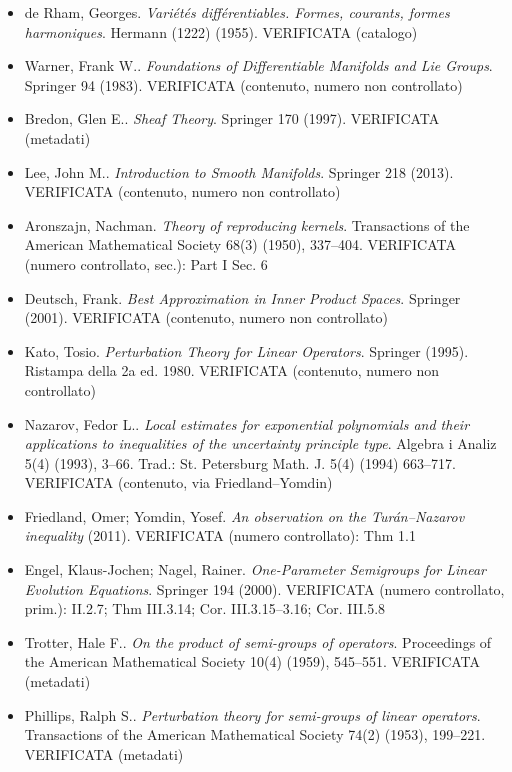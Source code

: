 \begin{itemize}[itemsep=2pt,leftmargin=1.2em,font=\small]
\item de Rham, Georges. \emph{Vari{\'e}t{\'e}s diff{\'e}rentiables. Formes, courants, formes harmoniques}. Hermann (1222) (1955). \textsf{\footnotesize VERIFICATA (catalogo)}
\item Warner, Frank W.. \emph{Foundations of Differentiable Manifolds and Lie Groups}. Springer 94 (1983). \textsf{\footnotesize VERIFICATA (contenuto, numero non controllato)}
\item Bredon, Glen E.. \emph{Sheaf Theory}. Springer 170 (1997). \textsf{\footnotesize VERIFICATA (metadati)}
\item Lee, John M.. \emph{Introduction to Smooth Manifolds}. Springer 218 (2013). \textsf{\footnotesize VERIFICATA (contenuto, numero non controllato)}
\item Aronszajn, Nachman. \emph{Theory of reproducing kernels}. Transactions of the American Mathematical Society 68(3) (1950), 337--404. \textsf{\footnotesize VERIFICATA (numero controllato, sec.): Part I Sec. 6}
\item Deutsch, Frank. \emph{Best Approximation in Inner Product Spaces}. Springer (2001). \textsf{\footnotesize VERIFICATA (contenuto, numero non controllato)}
\item Kato, Tosio. \emph{Perturbation Theory for Linear Operators}. Springer (1995). \textsf{\footnotesize Ristampa della 2a ed. 1980. VERIFICATA (contenuto, numero non controllato)}
\item Nazarov, Fedor L.. \emph{Local estimates for exponential polynomials and their applications to inequalities of the uncertainty principle type}. Algebra i Analiz 5(4) (1993), 3--66. \textsf{\footnotesize Trad.: St. Petersburg Math. J. 5(4) (1994) 663--717. VERIFICATA (contenuto, via Friedland--Yomdin)}
\item Friedland, Omer; Yomdin, Yosef. \emph{An observation on the {T}ur{\'a}n--{N}azarov inequality} (2011). \textsf{\footnotesize VERIFICATA (numero controllato): Thm 1.1}
\item Engel, Klaus-Jochen; Nagel, Rainer. \emph{One-Parameter Semigroups for Linear Evolution Equations}. Springer 194 (2000). \textsf{\footnotesize VERIFICATA (numero controllato, prim.): II.2.7; Thm III.3.14; Cor. III.3.15--3.16; Cor. III.5.8}
\item Trotter, Hale F.. \emph{On the product of semi-groups of operators}. Proceedings of the American Mathematical Society 10(4) (1959), 545--551. \textsf{\footnotesize VERIFICATA (metadati)}
\item Phillips, Ralph S.. \emph{Perturbation theory for semi-groups of linear operators}. Transactions of the American Mathematical Society 74(2) (1953), 199--221. \textsf{\footnotesize VERIFICATA (metadati)}

\end{itemize}
